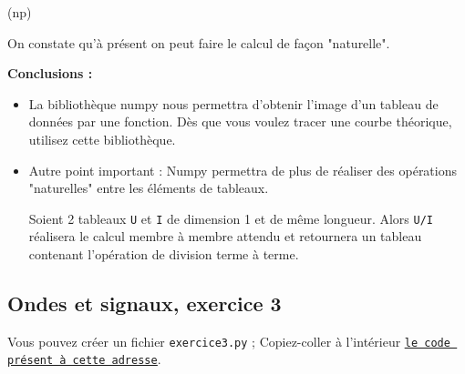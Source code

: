 \documentclass[11pt]{article}
\begin{document}
\begin{enumerate}
\begin{python}{0.8}
    
    \chev \dir(np) 
    
   \end{python}

    On constate qu'à présent on peut faire le calcul de façon "naturelle".
    
    
    \textbf{Conclusions : } 
    
    \begin{itemize}
     \item La bibliothèque numpy nous permettra d'obtenir l'image d'un tableau de données par une fonction. Dès que vous voulez tracer une courbe théorique, utilisez cette bibliothèque. 
     \item Autre point important : Numpy permettra de plus de réaliser des opérations "naturelles" entre les éléments de tableaux. 
     
     Soient 2 tableaux \texttt{U} et \texttt{I} de dimension 1 et de même longueur. Alors \texttt{U/I} réalisera le calcul membre à membre attendu et retournera un tableau contenant l'opération de division terme à terme.
    \end{itemize}

    
    
    

 
 
\end{enumerate}



\subsection{Ondes et signaux, exercice 3}






\bigskip




Vous pouvez créer un fichier \texttt{exercice3.py} ; Copiez-coller à l'intérieur \href{https://github.com/formationPythonPC-Juin/aides-formation/blob/master/exercice3-aide.py}{\underline{\texttt{le code présent à cette adresse}}}. 
\end{document}
